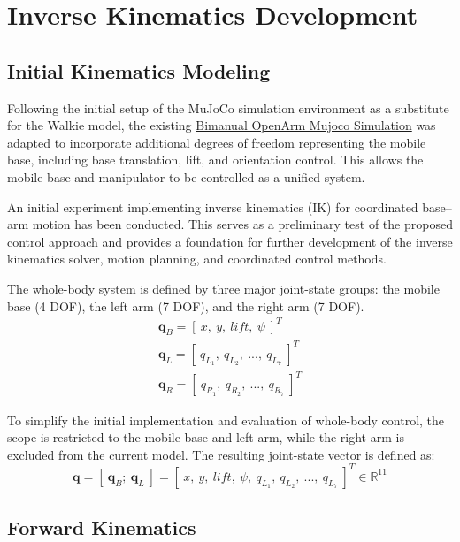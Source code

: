 \documentclass[12pt,a4paper]{article}
\begin{document}
\setcounter{page}{1}

\section*{Inverse Kinematics Development}
\subsection*{Initial Kinematics Modeling}
Following the initial setup of the MuJoCo simulation environment as a substitute for the Walkie model, the existing \textcolor{blue}{\href{https://github.com/enactic/openarm_mujoco}{Bimanual OpenArm Mujoco Simulation}} was adapted to incorporate additional degrees of freedom representing the mobile base, including base translation, lift, and orientation control. This allows the mobile base and manipulator to be controlled as a unified system.

An initial experiment implementing inverse kinematics (IK) for coordinated base–arm motion has been conducted. This serves as a preliminary test of the proposed control approach and provides a foundation for further development of the inverse kinematics solver, motion planning, and coordinated control methods.

The whole-body system is defined by three major joint-state groups: the mobile base (4 DOF), the left arm (7 DOF), and the right arm (7 DOF).
\begin{gather*}
    \mathbf{q}_B=[\ x,\ y,\ lift,\ \psi\ ]^T\\
    \mathbf{q}_{L} = [\ q_{L_1},\ q_{L_2},\ ...,\ q_{L_7}\ ]^T\\ 
    \mathbf{q}_{R} = [\ q_{R_1},\ q_{R_2},\ ...,\ q_{R_7}\ ]^T
\end{gather*}

To simplify the initial implementation and evaluation of whole-body control, the scope is restricted to the mobile base and left arm, while the right arm is excluded from the current model. The resulting joint-state vector is defined as:
\begin{equation}
    \mathbf{q} = [\ \mathbf{q}_B;\ \mathbf{q}_L\ ]= [\ x,\ y,\ lift,\ \psi, \ q_{L_1},\ q_{L_2},\ ...,\ q_{L_7}\ ]^T \in\mathbb{R}^{11}
\end{equation}

\newpage

\subsection*{Forward Kinematics}
\end{document}
